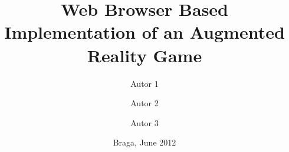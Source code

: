 \documentclass[10pt,a4paper,twocolumn]{article}
\title{Web Browser Based Implementation of an Augmented Reality Game}
\author{Autor 1 \\%
\and
Autor 2 %
\and
Autor 3%
}
\date{Braga, June 2012}
\begin{document}
\maketitle






\nocite{*}

\printbibliography

\appendix


%
\end{document}

